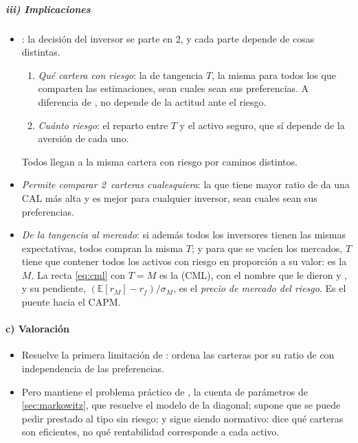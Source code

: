 \documentclass[11pt]{article}
\begin{document}
\subparagraph{iii) Implicaciones}

\begin{itemize}
\item {}\nocite{Tobin1958Liquidity}: la decisión del inversor se parte en 2, y cada parte depende de cosas distintas.
  \begin{enumerate}
  \item \emph{Qué cartera con riesgo}: la de tangencia $T$, la misma para todos los que comparten las estimaciones, sean cuales sean sus preferencias. A diferencia de , no depende de la actitud ante el riesgo.
  \item \emph{Cuánto riesgo}: el reparto entre $T$ y el activo seguro, que sí depende de la aversión de cada uno.
  \end{enumerate}
  Todos llegan a la misma cartera con riesgo por caminos distintos.
\item \emph{Permite comparar 2~carteras cualesquiera}: la que tiene mayor ratio de  da una CAL más alta y es mejor para cualquier inversor, sean cuales sean sus preferencias.
\item \emph{De la tangencia al mercado}: si además todos los inversores tienen las mismas expectativas, todos compran la misma $T$; y para que se vacíen los mercados, $T$ tiene que contener todos los activos con riesgo en proporción a su valor: es la  $M$. La recta \eqref{eq:cml} con $T=M$ es la  (CML), con el nombre que le dieron  y , y su pendiente, $(\mathbb{E}[r_M]-r_f)/\sigma_M$, es el \emph{precio de mercado del riesgo}. Es el puente hacia el CAPM.
\end{itemize}

\paragraph{c) Valoración}

\begin{itemize}
\item Resuelve la primera limitación de : ordena las carteras por su ratio de  con independencia de las preferencias.
\item Pero mantiene el problema práctico de , la cuenta de parámetros de \ref{sec:markowitz}, que resuelve el modelo de la diagonal; supone que se puede pedir prestado al tipo sin riesgo; y sigue siendo normativo: dice qué carteras son eficientes, no qué rentabilidad corresponde a cada activo.
\end{itemize}
\end{document}
